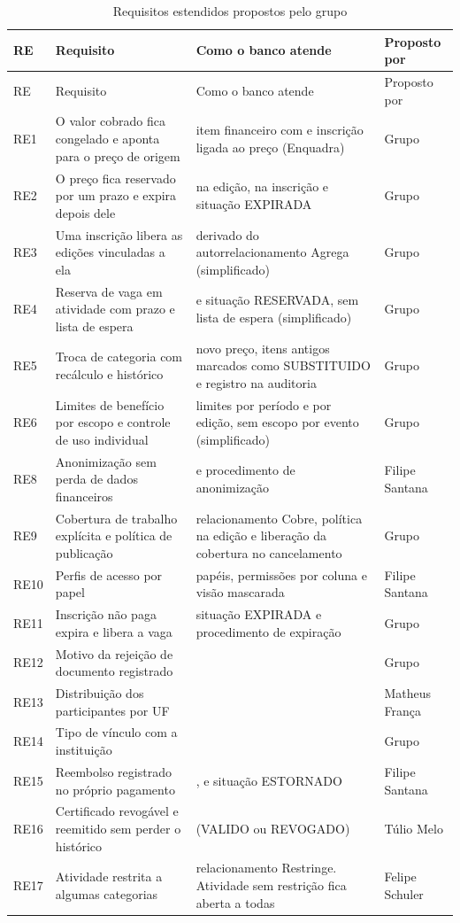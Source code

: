 \begin{longtable}{@{}l L{4.9cm} L{4.8cm} L{2.8cm}@{}}
\caption{Requisitos estendidos propostos pelo grupo}\label{tab:re}\\
\toprule
RE & Requisito & Como o banco atende & Proposto por\\
\midrule
\endfirsthead
\toprule
RE & Requisito & Como o banco atende & Proposto por\\
\midrule
\endhead
\bottomrule
\endfoot
RE1 & O valor cobrado fica congelado e aponta para o preço de origem & item financeiro com  e inscrição ligada ao preço (Enquadra) & Grupo\\
RE2 & O preço fica reservado por um prazo e expira depois dele &  na edição,  na inscrição e situação EXPIRADA & Grupo\\
RE3 & Uma inscrição libera as edições vinculadas a ela & derivado do autorrelacionamento Agrega (simplificado) & Grupo\\
RE4 & Reserva de vaga em atividade com prazo e lista de espera &  e situação RESERVADA, sem lista de espera (simplificado) & Grupo\\
RE5 & Troca de categoria com recálculo e histórico & novo preço, itens antigos marcados como SUBSTITUIDO e registro na auditoria & Grupo\\
RE6 & Limites de benefício por escopo e controle de uso individual & limites por período e por edição, sem escopo por evento (simplificado) & Grupo\\
RE8 & Anonimização sem perda de dados financeiros &  e procedimento de anonimização & Filipe Santana\\
RE9 & Cobertura de trabalho explícita e política de publicação & relacionamento Cobre, política na edição e liberação da cobertura no cancelamento & Grupo\\
RE10 & Perfis de acesso por papel & papéis, permissões por coluna e visão mascarada & Filipe Santana\\
RE11 & Inscrição não paga expira e libera a vaga & situação EXPIRADA e procedimento de expiração & Grupo\\
RE12 & Motivo da rejeição de documento registrado &  & Grupo\\
RE13 & Distribuição dos participantes por UF &  & Matheus França\\
RE14 & Tipo de vínculo com a instituição &  & Grupo\\
RE15 & Reembolso registrado no próprio pagamento & ,  e situação ESTORNADO & Filipe Santana\\
RE16 & Certificado revogável e reemitido sem perder o histórico &  (VALIDO ou REVOGADO) & Túlio Melo\\
RE17 & Atividade restrita a algumas categorias & relacionamento Restringe. Atividade sem restrição fica aberta a todas & Felipe Schuler\\
\end{longtable}

